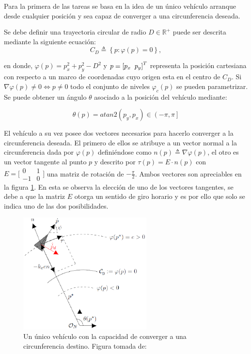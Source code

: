 Para la primera de las tareas se basa en la idea de un único vehículo arranque desde cualquier posición y sea capaz de converger a una circunferencia deseada.

Se debe definir una trayectoria circular de radio $D\in\mathbb{R}^+$ puede ser descrita mediante la siguiente ecuación:
\begin{equation}	
	C_D\triangleq\left\lbrace{p:\varphi{\left(p\right)}=0}\right\rbrace{,}
\end{equation}

en donde, $\varphi\left(p\right)=p_{x}^{2}+p_{y}^{2}-D^{2}$ y $p=\left[p_x\hspace{2mm}p_y\right]^T$ representa la posición cartesiana con respecto a un marco de coordenadas cuyo origen esta en el centro de $C_D$. Si $\nabla{\varphi\left(p\right)}\neq{0}\Longleftrightarrow{p}\neq{0}$ todo el conjunto de niveles $\varphi_c\left(p\right)$ se pueden parametrizar. Se puede obtener un ángulo $\theta$ asociado a la posición del vehículo mediante:

\begin{equation}
	\theta\left(p\right)=atan2\left(p_{y},p_{x}\right)\in\left(-\pi,\pi\right]
\end{equation} 

El vehículo a su vez posee dos vectores necesarios para hacerlo converger a la circunferencia deseada. El primero de ellos se atribuye a un vector normal a la circunferencia dada por $\varphi\left(p\right)$ definiéndose como $n\left(p\right)\triangleq\nabla\varphi\left(p\right)$, el otro es un vector tangente al punto $p$ y descrito por $\tau\left(p\right)=E\cdot{n\left(p\right)}$ con $E = \bigl[\begin{smallmatrix}0 & 1\\ -1 & 0\end{smallmatrix}\bigr]$ una matriz de rotación de $-\frac{\pi}{2}$. Ambos vectores son apreciables en la figura \ref{Primera_Acción_Control}. En esta se observa la elección de uno de los vectores tangentes, se debe a que la matriz $E$ otorga un sentido de giro horario y es por ello que solo se indica uno de las dos posibilidades.

\newpage
\begin{figure}[htb]
\centering
\includegraphics[width=0.60\textwidth]{figures/Coord_1.eps}
\caption{Un único vehículo con la capacidad de converger a una circunferencia destino. Figura tomada de: \cite{Control_Formacion}} \label{Primera_Acción_Control}
\end{figure}

